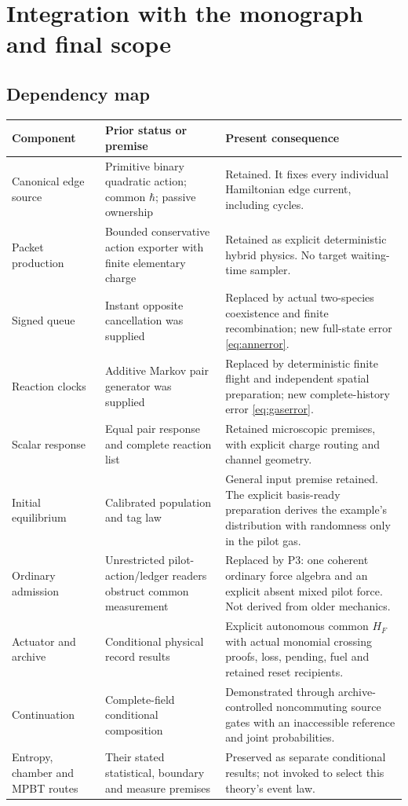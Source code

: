 \documentclass[11pt]{article}
\theoremstyle{definition}\newtheorem{definition}[theorem]{Definition}
\theoremstyle{remark}\newtheorem{remark}[theorem]{Remark}
\begin{document}
\section{Integration with the monograph and final scope}
\subsection{Dependency map}
\begin{longtable}{>{\raggedright\arraybackslash}p{}>{\raggedright\arraybackslash}p{}>{\raggedright\arraybackslash}p{}}
\toprule
Component & Prior status or premise & Present consequence\\
\midrule
\endhead
Canonical edge source & Primitive binary quadratic action; common $\hbar$; passive ownership & Retained. It fixes every individual Hamiltonian edge current, including cycles.\\
Packet production & Bounded conservative action exporter with finite elementary charge & Retained as explicit deterministic hybrid physics. No target waiting-time sampler.\\
Signed queue & Instant opposite cancellation was supplied & Replaced by actual two-species coexistence and finite recombination; new full-state error \eqref{eq:annerror}.\\
Reaction clocks & Additive Markov pair generator was supplied & Replaced by deterministic finite flight and independent spatial preparation; new complete-history error \eqref{eq:gaserror}.\\
Scalar response & Equal pair response and complete reaction list & Retained microscopic premises, with explicit charge routing and channel geometry.\\
Initial equilibrium & Calibrated population and tag law & General input premise retained. The explicit basis-ready preparation derives the example's distribution with randomness only in the pilot gas.\\
Ordinary admission & Unrestricted pilot-action/ledger readers obstruct common measurement & Replaced by P3: one coherent ordinary force algebra and an explicit absent mixed pilot force. Not derived from older mechanics.\\
Actuator and archive & Conditional physical record results & Explicit autonomous common $H_F$ with actual monomial crossing proofs, loss, pending, fuel and retained reset recipients.\\
Continuation & Complete-field conditional composition & Demonstrated through archive-controlled noncommuting source gates with an inaccessible reference and joint probabilities.\\
Entropy, chamber and MPBT routes & Their stated statistical, boundary and measure premises & Preserved as separate conditional results; not invoked to select this theory's event law.\\
\bottomrule
\end{longtable}
\end{document}

